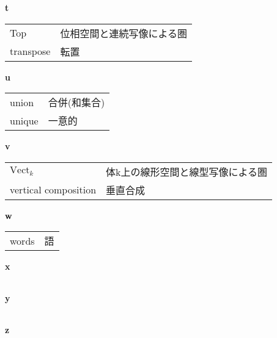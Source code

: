 \documentclass[dvipdfmx]{jsarticle}
\begin{document}
\textbf{t}

  \begin{tabular}{ll}
    Top & 位相空間と連続写像による圏 \\
    transpose & 転置 \\
  \end{tabular}

\textbf{u}

  \begin{tabular}{ll}
    union & 合併(和集合) \\
    unique & 一意的 \\
  \end{tabular}

\textbf{v}

  \begin{tabular}{ll}
    $\mathrm{Vect}_k$ & 体k上の線形空間と線型写像による圏 \\
    vertical composition & 垂直合成 \\
  \end{tabular}

\textbf{w}

  \begin{tabular}{ll}
    words & 語 \\
  \end{tabular}

\textbf{x}

  \begin{tabular}{ll}
  \end{tabular}

\textbf{y}

  \begin{tabular}{ll}
  \end{tabular}

\textbf{z}

  \begin{tabular}{ll}
  \end{tabular}
\end{document}

